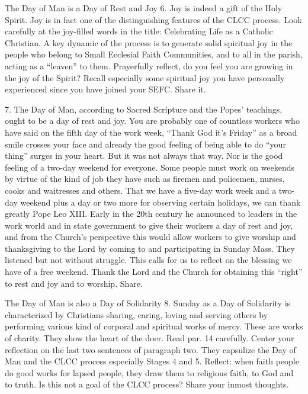 \documentclass[oneside]{book}
\begin{document}
The Day of Man is a Day of Rest and Joy
6. Joy is indeed a gift of the Holy Spirit. Joy is in fact one of the
distinguishing features of the CLCC process. Look carefully at the joy-filled
words in the title: Celebrating Life as a Catholic Christian. A key dynamic of
the process is to generate solid spiritual joy in the people who belong to Small
Ecclesial Faith Communities, and to all in the parish, acting as a ``leaven'' to
them. Prayerfully reflect, do you feel you are growing in the joy of the Spirit?
Recall especially some spiritual joy you have personally experienced since you
have joined your SEFC. Share it.

7. The Day of Man, according to Sacred Scripture and the Popes' teachings, ought
to be a day of rest and joy. You are probably one of countless workers who have
said on the fifth day of the work week, ``Thank God it's Friday'' as a broad
smile crosses your face and already the good feeling of being able to do ``your
thing'' surges in your heart. But it was not always that way. Nor is the good
feeling of a two-day weekend for everyone. Some people must work on weekends by
virtue of the kind of job they have such as firemen and policemen, nurses, cooks
and waitresses and others.
That we have a five-day work week and a two-day weekend plus a day or two more
for observing certain holidays, we can thank greatly Pope Leo XIII. Early in the
20th century he announced to leaders in the work world and in state government
to give their workers a day of rest and joy, and from the Church's perspective
this would allow workers to give worship and thanksgiving to the Lord by coming
to and participating in Sunday Mass. They listened but not without
struggle. This calls for us to reflect on the blessing we have of a free
weekend. Thank the Lord and the Church for obtaining this ``right'' to rest and
joy and to worship. Share.

The Day of Man is also a Day of Solidarity
8. Sunday as a Day of Solidarity is characterized by Christians sharing, caring,
loving and serving others by performing various kind of corporal and spiritual
works of mercy. These are works of charity. They show the heart of the
doer. Read par. 14 carefully. Center your reflection on the last two sentences
of paragraph two. They capsulize the Day of Man and the CLCC process especially
Stages 4 and 5. Reflect: when faith people do good works for lapsed people, they
draw them to religious faith, to God and to truth. Is this not a goal of the
CLCC process? Share your inmost thoughts.
\end{document}
